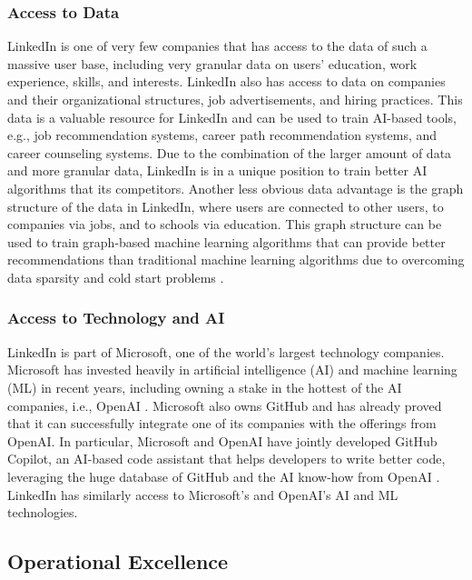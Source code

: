 \subsubsection{Access to Data}

LinkedIn is one of very few companies that has access to the data of such a massive user base, including
very granular data on users' education, work experience, skills, and interests. LinkedIn also has access
to data on companies and their organizational structures, job advertisements, and hiring practices. This
data is a valuable resource for LinkedIn and can be used to train AI-based tools, e.g., job recommendation
systems, career path recommendation systems, and career counseling systems. Due to the combination of the
larger amount of data and more granular data, LinkedIn is in a unique position to train better AI algorithms
that its competitors. Another less obvious data advantage is the graph structure of the data in LinkedIn,
where users are connected to other users, to companies via jobs, and to schools via education. This graph
structure can be used to train graph-based machine learning algorithms that can provide better recommendations
than traditional machine learning algorithms due to overcoming data sparsity and cold start problems
\citep{zhangRecommendingGraphsComprehensive2023}.

\subsubsection{Access to Technology and AI}

LinkedIn is part of Microsoft, one of the world's largest technology companies. Microsoft has invested heavily
in artificial intelligence (AI) and machine learning (ML) in recent years, including owning a stake in the hottest
of the AI companies, i.e., OpenAI \citep{openaiAnnouncementOpenAIMicrosoft2023}. Microsoft also owns GitHub and has
already proved that it can successfully integrate one of its companies with the offerings from OpenAI. In particular,
Microsoft and OpenAI have jointly developed GitHub Copilot, an AI-based code assistant that helps developers to write
better code, leveraging the huge database of GitHub and the AI know-how from OpenAI \citep{novetMicrosoftOpenAIHave2021}.
LinkedIn has similarly access to Microsoft's and OpenAI's AI and ML technologies. 

\subsection{Operational Excellence}

